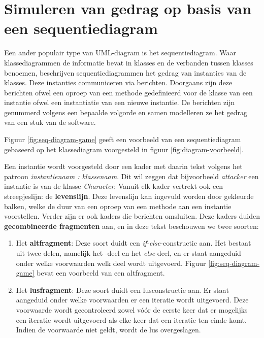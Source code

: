 \chapter{Simuleren van gedrag op basis van een sequentiediagram}\label{sec:gedrag}
Een ander populair type van UML-diagram is het sequentiediagram. Waar klassediagrammen de informatie bevat in klasses en de verbanden tussen klasses benoemen, beschrijven sequentiediagrammen het gedrag van instanties van de klasses. Deze instanties communiceren via berichten. Doorgaans zijn deze berichten ofwel een oproep van een methode gedefinieerd voor de klasse van een instantie ofwel een instantiatie van een nieuwe instantie. De berichten zijn genummerd volgens een bepaalde volgorde en samen modelleren ze het gedrag van een stuk van de software.

\parbreak

Figuur \ref{fig:seq-diagram-game} geeft een voorbeeld van een sequentiediagram gebaseerd op het klassediagram voorgesteld in figuur \ref{fig:diagram-voorbeeld}.

Een instantie wordt voorgesteld door een kader met daarin tekst volgens het patroon \textit{instantienaam : klassenaam}. Dit wil zeggen dat bijvoorbeeld \textit{attacker} een instantie is van de klasse \textit{Character}. Vanuit elk kader vertrekt ook een streepjeslijn: de \textbf{levenslijn}. Deze levenslijn kan ingevuld worden door gekleurde balken, welke de duur van een oproep van een methode aan een instantie voorstellen.
Verder zijn er ook kaders die berichten omsluiten. Deze kaders duiden \textbf{gecombineerde fragmenten} aan, en in deze tekst beschouwen we twee soorten:

\begin{enumerate}
	\item Het \textbf{altfragment}: Deze soort duidt een \textit{if-else}-constructie aan. Het bestaat uit twee delen, namelijk het -deel en het \textit{else}-deel, en er staat aangeduid onder welke voorwaarden welk deel wordt uitgevoerd. Figuur \ref{fig:seq-diagram-game} bevat een voorbeeld van een altfragment.
	\item Het \textbf{lusfragment}: Deze soort duidt een lusconstructie aan. Er staat aangeduid onder welke voorwaarden er een iteratie wordt uitgevoerd. Deze voorwaarde wordt gecontroleerd zowel v\'o\'or de eerste keer dat er mogelijks een iteratie wordt uitgevoerd als elke keer dat een iteratie ten einde komt. Indien de voorwaarde niet geldt, wordt de lus overgeslagen. 
\end{enumerate}

